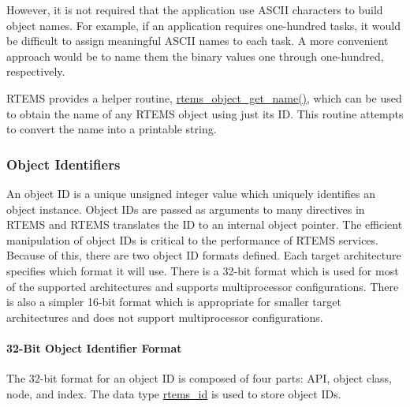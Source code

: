 \begin{DoxyCode}{0}
\end{DoxyCode}


However, it is not required that the application use A\+S\+C\+II characters to build object names. For example, if an application requires one-\/hundred tasks, it would be difficult to assign meaningful A\+S\+C\+II names to each task. A more convenient approach would be to name them the binary values one through one-\/hundred, respectively.

R\+T\+E\+MS provides a helper routine, \mbox{\hyperlink{group__ClassicClassInfo_ga85242d8af75f936826239cf37493fe0b}{rtems\+\_\+object\+\_\+get\+\_\+name()}}, which can be used to obtain the name of any R\+T\+E\+MS object using just its ID. This routine attempts to convert the name into a printable string.\hypertarget{group__RTEMSAPIClassic_ClassicRTEMSSubSecObjectIdentifiers}{}\subsubsection{Object Identifiers}\label{group__RTEMSAPIClassic_ClassicRTEMSSubSecObjectIdentifiers}
An object ID is a unique unsigned integer value which uniquely identifies an object instance. Object I\+Ds are passed as arguments to many directives in R\+T\+E\+MS and R\+T\+E\+MS translates the ID to an internal object pointer. The efficient manipulation of object I\+Ds is critical to the performance of R\+T\+E\+MS services. Because of this, there are two object ID formats defined. Each target architecture specifies which format it will use. There is a 32-\/bit format which is used for most of the supported architectures and supports multiprocessor configurations. There is also a simpler 16-\/bit format which is appropriate for smaller target architectures and does not support multiprocessor configurations.\hypertarget{group__RTEMSAPIClassic_ClassicRTEMSSubSec32BitObjectIdentifierFormat}{}\paragraph{32-\/\+Bit Object Identifier Format}\label{group__RTEMSAPIClassic_ClassicRTEMSSubSec32BitObjectIdentifierFormat}
The 32-\/bit format for an object ID is composed of four parts\+: A\+PI, object class, node, and index. The data type \mbox{\hyperlink{group__ClassicTasks_gab20892b814dced7dd4e5b9bf42becd57}{rtems\+\_\+id}} is used to store object I\+Ds.

